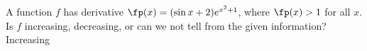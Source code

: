 {A function $f$ has derivative $\fp(x) = (\sin x+2)e^{x^2+1}$, where $\fp(x) >1 $ for all $x$. Is $f$ increasing, decreasing, or can we not tell from the given information?
}
{Increasing
}
